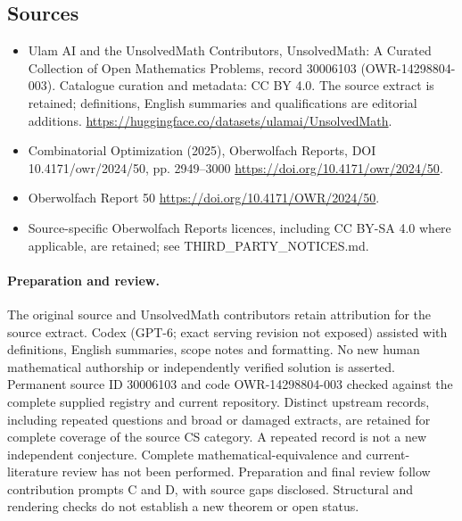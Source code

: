 \documentclass[11pt]{article}
\begin{document}
\subsection{Sources}
\begin{itemize}
\item[\hypertarget{source:30006103:1}{S1}] Ulam AI and the UnsolvedMath Contributors, UnsolvedMath: A Curated Collection of Open Mathematics Problems, record 30006103 (OWR-14298804-003). Catalogue curation and metadata: CC BY 4.0. The source extract is retained; definitions, English summaries and qualifications are editorial additions.
\url{https://huggingface.co/datasets/ulamai/UnsolvedMath}.
\item[\hypertarget{source:30006103:2}{S2}] Combinatorial Optimization (2025), Oberwolfach Reports, DOI 10.4171/owr/2024/50, pp. 2949--3000
\url{https://doi.org/10.4171/owr/2024/50}.
\item[\hypertarget{source:30006103:3}{S3}] Oberwolfach Report 50
\url{https://doi.org/10.4171/OWR/2024/50}.
\item Source-specific Oberwolfach Reports licences, including CC BY-SA 4.0 where applicable, are retained; see THIRD\_PARTY\_NOTICES.md.
\end{itemize}
\paragraph{Preparation and review.}
The original source and UnsolvedMath contributors retain attribution for the source extract. Codex (GPT-6; exact serving revision not exposed) assisted with definitions, English summaries, scope notes and formatting. No new human mathematical authorship or independently verified solution is asserted. Permanent source ID 30006103 and code OWR-14298804-003 checked against the complete supplied registry and current repository. Distinct upstream records, including repeated questions and broad or damaged extracts, are retained for complete coverage of the source CS category. A repeated record is not a new independent conjecture. Complete mathematical-equivalence and current-literature review has not been performed. Preparation and final review follow contribution prompts C and D, with source gaps disclosed. Structural and rendering checks do not establish a new theorem or open status.
\label{end:30006103}
\end{document}
